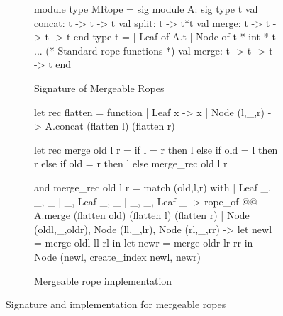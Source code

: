 \begin{figure}

\begin{subfigure}{0.35\textwidth}
\begin{ocaml}
module type MRope = sig
  module A: sig
    type t
    val concat: t -> t -> t
    val split: t -> t*t
    val merge: t -> t -> t -> t
  end
  type t =
  | Leaf of A.t
  | Node of t * int * t
  ... 
  (* Standard rope functions *)
  val merge: t -> t -> t -> t 
end
\end{ocaml}
\caption{Signature of Mergeable Ropes}
\label{fig:mrope-sig}
\end{subfigure}
\begin{subfigure}{0.6\textwidth}
\begin{ocaml}
let rec flatten = function
  | Leaf x -> x
  | Node (l,_,r) -> A.concat (flatten l) (flatten r)

let rec merge old l r =
  if l = r then l else if old = l then r
  else if old = r then l else merge_rec old l r

and merge_rec old l r = match (old,l,r) with
  | Leaf _, _, _ | _, Leaf _, _ 
  | _, _, Leaf _ -> 
      rope_of @@ A.merge (flatten old) 
                    (flatten l) (flatten r)
  | Node (oldl,_,oldr), Node (ll,_,lr), 
    Node (rl,_,rr) ->
      let newl = merge oldl ll rl in
      let newr = merge oldr lr rr in
        Node (newl, create_index newl, newr)
\end{ocaml}
\caption{Mergeable rope implementation}
\label{fig:mrope-merge}
\end{subfigure}

\caption{Signature and implementation for mergeable ropes}
\label{fig:rope}
\end{figure}
